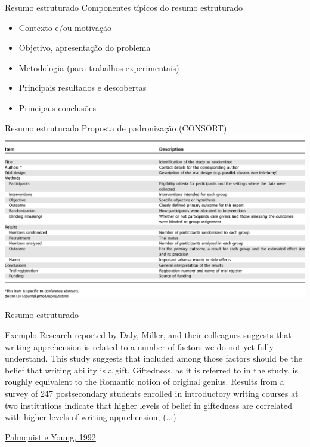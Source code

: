 \documentclass{beamer}
\begin{document}
\begin{frame}{Resumo estruturado}
  Componentes típicos do resumo estruturado
  \begin{itemize}
  \item Contexto e/ou motivação
  \item Objetivo, apresentação do problema
  \item Metodologia (para trabalhos experimentais)
  \item Principais resultados e descobertas
  \item Principais conclusões
  \end{itemize}
\end{frame}

\begin{frame}{Resumo estruturado}
  Proposta de padronização (CONSORT)
  \includegraphics[height=0.8\textheight]{Revisao_resumo/resumo_estruturado}
\end{frame}

\begin{frame}{Resumo estruturado}
  \begin{exampleblock}{Exemplo}
    \scriptsize
    Research reported by Daly, Miller, and their colleagues suggests
    that writing apprehension is related to a number of factors we do
    not yet fully understand. This study suggests that included among
    those factors should be the belief that writing ability is a
    gift. Giftedness, as it is referred to in the study, is roughly
    equivalent to the Romantic notion of original genius. Results from
    a survey of 247 postsecondary students enrolled in introductory
    writing courses at two institutions indicate that higher levels of
    belief in giftedness are correlated with higher levels of writing
    apprehension, (...) 
  \end{exampleblock}

  \vfill
  \scriptsize
  \hfill \href{https://doi.org/10.1177/0741088392009001004}{Palmquist e Young, 1992}
\end{frame}
\end{document}
